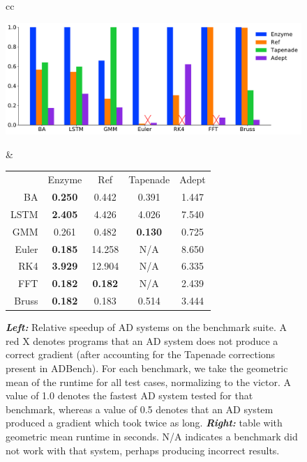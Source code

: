 \begin{figure}
    \centering

\begin{tabular}{cc}
\hspace*{-1cm}
\begin{minipage}[T]{0.69\linewidth}
\includegraphics[width=0.99\linewidth]{figs/all.pdf}
\end{minipage}
&
\begin{minipage}[T]{0.29\linewidth}
\hspace*{-1cm} {\scriptsize \begin{tabular}{r|c|c|c|c}
& Enzyme& Ref& Tapenade& Adept\\
BA& \textbf{0.250}& 0.442& 0.391& 1.447\\
LSTM& \textbf{2.405}& 4.426& 4.026& 7.540\\
GMM& 0.261& 0.482& \textbf{0.130}& 0.725\\
Euler& \textbf{0.185}& 14.258& N/A& 8.650\\
RK4& \textbf{3.929}& 12.904& N/A& 6.335\\
FFT& \textbf{0.182}& \textbf{0.182}& N/A& 2.439\\
Bruss& \textbf{0.182}& 0.183& 0.514& 3.444\\
\end{tabular}}
\end{minipage}
\end{tabular}
    \caption{\textbf{\textit{Left:}} Relative speedup of AD systems on the benchmark suite. A red X denotes programs that an AD system does not produce a correct gradient (after accounting for the Tapenade corrections present in ADBench). For each benchmark, we take the geometric mean of the runtime for all test cases, normalizing to the victor. A value of 1.0 denotes the fastest AD system tested for that benchmark, whereas a value of 0.5 denotes that an AD system produced a gradient which took twice as long. \textbf{\textit{Right:}} table with geometric mean runtime in seconds. N/A indicates a benchmark did not work with that system, perhaps producing incorrect results.}
    \label{fig:eval}
\end{figure}

